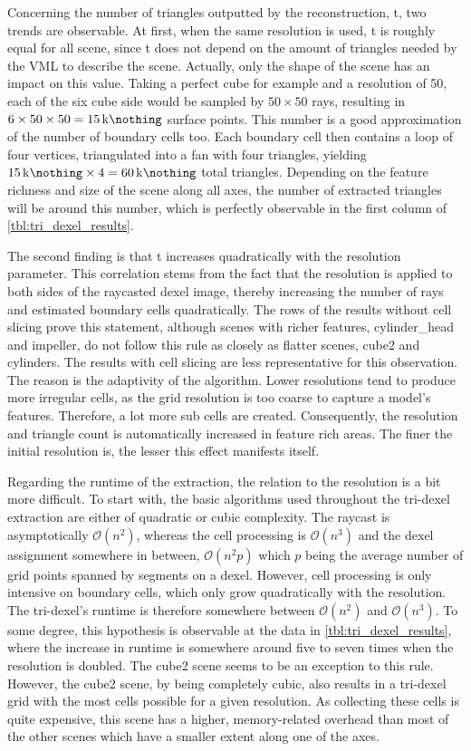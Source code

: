 %
Concerning the number of triangles outputted by the reconstruction, t, two trends are observable.
At first, when the same resolution is used, t is roughly equal for all scene, since t does not depend on the amount of triangles needed by the VML to describe the scene.
Actually, only the shape of the scene has an impact on this value.
Taking a perfect cube for example and a resolution of 50, each of the six cube side would be sampled by $50\times50$ rays, resulting in $6 \times 50 \times 50 = \SI{15}{\kilo\nothing}$ surface points.
This number is a good approximation of the number of boundary cells too.
Each boundary cell then contains a loop of four vertices, triangulated into a fan with four triangles, yielding $\SI{15}{\kilo\nothing} \times 4 = \SI{60}{\kilo\nothing}$ total triangles.
Depending on the feature richness and size of the scene along all axes, the number of extracted triangles will be around this number, which is perfectly observable in the first column of \cref{tbl:tri_dexel_results}.

The second finding is that t increases quadratically with the resolution parameter.
This correlation stems from the fact that the resolution is applied to both sides of the raycasted dexel image, thereby increasing the number of rays and estimated boundary cells quadratically.
The rows of the results without cell slicing prove this statement, although scenes with richer features, \eg cylinder\_head and impeller, do not follow this rule as closely as flatter scenes, \eg cube2 and cylinders.
The results with cell slicing are less representative for this observation.
The reason is the adaptivity of the algorithm.
Lower resolutions tend to produce more irregular cells, as the grid resolution is too coarse to capture a model's features.
Therefore, a lot more sub cells are created.
Consequently, the resolution and triangle count is automatically increased in feature rich areas.
The finer the initial resolution is, the lesser this effect manifests itself.

Regarding the runtime of the extraction, the relation to the resolution is a bit more difficult.
To start with, the basic algorithms used throughout the tri-dexel extraction are either of quadratic or cubic complexity.
The raycast is asymptotically $\mathcal{O}(n^2)$, whereas the cell processing is $\mathcal{O}(n^3)$ and the dexel assignment somewhere in between, $\mathcal{O}(n^2p)$ which $p$ being the average number of grid points spanned by segments on a dexel.
However, cell processing is only intensive on boundary cells, which only grow quadratically with the resolution.
The tri-dexel's runtime is therefore somewhere between $\mathcal{O}(n^2)$ and $\mathcal{O}(n^3)$.
To some degree, this hypothesis is observable at the data in \cref{tbl:tri_dexel_results}, where the increase in runtime is somewhere around five to seven times when the resolution is doubled.
The cube2 scene seems to be an exception to this rule.
However, the cube2 scene, by being completely cubic, also results in a tri-dexel grid with the most cells possible for a given resolution.
As collecting these cells is quite expensive, this scene has a higher, memory-related overhead than most of the other scenes which have a smaller extent along one of the axes.

